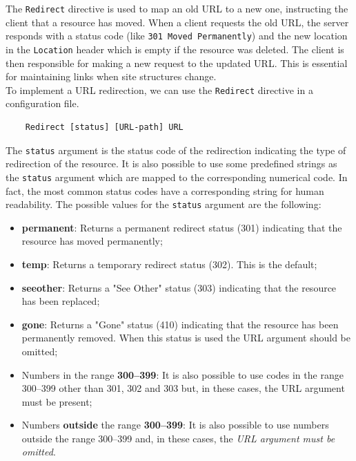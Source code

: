 \documentclass{scrbook}
\begin{document}
	The \texttt{Redirect} directive is used to map an old URL to a new one, instructing the client that a resource has moved. When a client requests the old URL, the server responds with a status code (like \texttt{301 Moved Permanently}) and the new location in the \texttt{Location} header which is empty if the resource was deleted. The client is then responsible for making a new request to the updated URL. This is essential for maintaining links when site structures change.\\
	
	To implement a URL redirection, we can use the \texttt{Redirect} directive in a configuration file.
	
	\begin{lstlisting}
	Redirect [status] [URL-path] URL
	\end{lstlisting}
	
	The \texttt{status} argument is the status code of the redirection indicating the type of redirection of the resource. It is also possible to use some predefined strings as the \texttt{status} argument which are mapped to the corresponding numerical code. In fact, the most common status codes have a corresponding string for human readability. The possible values for the \texttt{status} argument are the following:
	\begin{itemize}
		\item
		\textbf{permanent}: Returns a permanent redirect status (301) indicating that the resource has moved permanently;
		
		\item 
		\textbf{temp}: Returns a temporary redirect status (302). This is the default;
		
		\item 
		\textbf{seeother}: Returns a "See Other" status (303) indicating that the resource has been replaced;
		
		\item 
		\textbf{gone}: Returns a "Gone" status (410) indicating that the resource has been permanently removed. When this status is used the URL argument should be omitted;
		
		\item 
		Numbers in the range \textbf{300--399}: It is also possible to use codes in the range 300--399 other than 301, 302 and 303 but, in these cases, the URL argument must be present;
		
		\item 
		Numbers \textbf{outside} the range \textbf{300--399}: It is also possible to use numbers outside the range 300--399 and, in these cases, the \emph{URL argument must be omitted}.
	\end{itemize}
	
\end{document}
